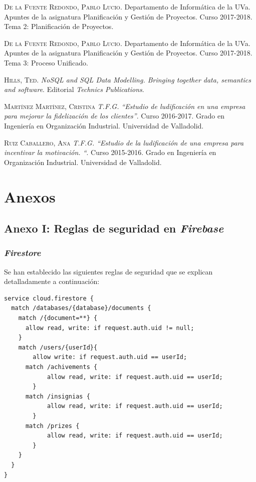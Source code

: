 \documentclass[twoside]{report}
\begin{document}
\begin{thebibliography}{a}
 \textsc{De la Fuente Redondo, Pablo Lucio}. Departamento de Informática de la UVa. Apuntes de la asignatura Planificación y Gestión de Proyectos. Curso 2017-2018. Tema 2: Planificación de Proyectos.

 \textsc{De la Fuente Redondo, Pablo Lucio}. Departamento de Informática de la UVa. Apuntes de la asignatura Planificación y Gestión de Proyectos. Curso 2017-2018. Tema 3: Proceso Unificado.

 \textsc{Hills, Ted}. \textit{NoSQL and SQL Data Modelling. Bringing together data, semantics and software}. Editorial \textit{Technics Publications}.

 \textsc{Martínez Martínez, Cristina} \textit{T.F.G. “Estudio de ludificación en una empresa para mejorar la fidelización de los clientes”}. Curso 2016-2017. Grado en Ingeniería en Organización Industrial. Universidad de Valladolid. 

 \textsc{Ruiz Caballero, Ana} \textit{T.F.G. “Estudio de la ludificación de una empresa para incentivar la motivación. “}. Curso 2015-2016. Grado en Ingeniería en Organización Industrial. Universidad de Valladolid. 

\end{thebibliography}

\part{Anexos}

\chapter*{Anexo I: Reglas de seguridad en \textit{Firebase}}
\section*{\textit{Firestore}}
Se han establecido las siguientes reglas de seguridad que se explican detalladamente a continuación:

\begin{lstlisting}
service cloud.firestore {
  match /databases/{database}/documents {
    match /{document=**} {
      allow read, write: if request.auth.uid != null;
    }
    match /users/{userId}{
    	allow write: if request.auth.uid == userId;
      match /achivements {
    		allow read, write: if request.auth.uid == userId;
    	}
      match /insignias {
    		allow read, write: if request.auth.uid == userId;
    	}
      match /prizes {
    		allow read, write: if request.auth.uid == userId;
    	}
    }
  }
}
\end{lstlisting}
\end{document}

